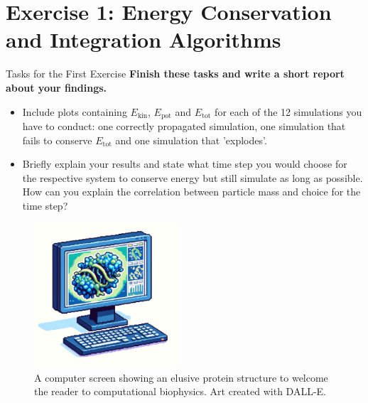 \documentclass[9pt,tutorial]{livecoms}
\begin{document}
\section{Exercise 1: Energy Conservation and Integration Algorithms}\label{sec:IntegrationTimestep}
\begin{Checklists}
    \begin{checklist}{Tasks for the First Exercise}
    \textbf{Finish these tasks and write a short report about your findings.}
    \begin{itemize}
    		\item Include plots containing $E_\text{kin}$, $E_\text{pot}$ and $E_\text{tot}$ for each of the 12 simulations you have to conduct: one correctly propagated simulation, one simulation that fails to conserve $E_\text{tot}$ and one simulation that 'explodes'.
    		
    		\item Briefly explain your results and state what time step you would choose for the respective system to conserve energy but still simulate as long as possible. How can you explain the correlation between particle mass and choice for the time step?
    \end{itemize}
    \end{checklist}
\end{Checklists}
\begin{figure}[H]
    \centering
    \includegraphics[width=0.48\textwidth]{figures/ComputationalBioPhysicsConcept.png}
    \caption{A computer screen showing an elusive protein structure to welcome the reader to computational biophysics. Art created with DALL-E.}
    \label{fig:ComputationalBioPhysicsConcept}
\end{figure}
\end{document}
